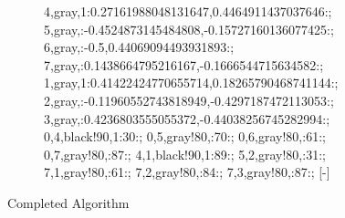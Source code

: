 \documentclass[\main/main.tex]{subfiles}
\begin{document}
\begin{figure}
\begin{subfigure}{0.25\textwidth}
{      4,gray,1:0.27161988048131647\textwidth,0.4464911437037646\textwidth:;
      5,gray,:-0.4524873145484808\textwidth,-0.15727160136077425\textwidth:;
      6,gray,:-0.5\textwidth,0.44069094493931893\textwidth:;
      7,gray,:0.1438664795216167\textwidth,-0.1666544715634582\textwidth:;
      1,gray,1:0.41422424770655714\textwidth,0.18265790468741144\textwidth:;
      2,gray,:-0.11960552743818949\textwidth,-0.4297187472113053\textwidth:;
      3,gray,:0.4236803555055372\textwidth,-0.44038256745282994\textwidth:;
    }{
      0,4,black!90,1:30:;
      0,5,gray!80,:70:;
      0,6,gray!80,:61:;
      0,7,gray!80,:87:;
      4,1,black!90,1:89:;
      5,2,gray!80,:31:;
      7,1,gray!80,:61:;
      7,2,gray!80,:84:;
      7,3,gray!80,:87:;
    }[-]
    \myAdigraph{}

  \end{subfigure}
  \caption{Completed Algorithm}
\end{figure}


\clearpage
\end{document}

